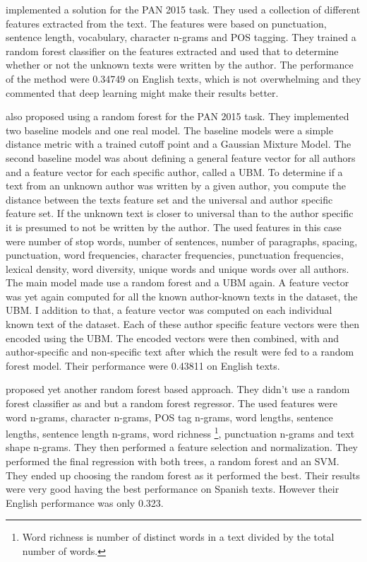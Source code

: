 \cite{maitra2015} implemented a solution for the PAN 2015 task. They used a
collection of different features extracted from the text. The features were
based on punctuation, sentence length, vocabulary, character n-grams and
\gls{POS} tagging. They trained a random forest classifier on the features
extracted and used that to determine whether or not the unknown texts were
written by the author. The performance of the method were 0.34749 on English
texts, which is not overwhelming and they commented that deep learning might
make their results better.

\cite{pacheco2015} also proposed using a random forest for the PAN 2015 task.
They implemented two baseline models and one real model. The baseline models
were a simple distance metric with a trained cutoff point and a Gaussian Mixture
Model. The second baseline model was about defining a general feature vector for
all authors and a feature vector for each specific author, called a \gls{UBM}.
To determine if a text from an unknown author was written by a given author,
you compute the distance between the texts feature set and the universal and
author specific feature set. If the unknown text is closer to universal than to
the author specific it is presumed to not be written by the author. The used
features in this case were number of stop words, number of sentences, number
of paragraphs, spacing, punctuation, word frequencies, character frequencies,
punctuation frequencies, lexical density, word diversity, unique words and
unique words over all authors. The main model made use a random forest and a
\gls{UBM} again. A feature vector was yet again computed for all the known
author-known texts in the dataset, the \gls{UBM}. I addition to that, a feature
vector was computed on each individual known text of the dataset. Each of these
author specific feature vectors were then encoded using the \gls{UBM}. The
encoded vectors were then combined, with and author-specific and non-specific
text after which the result were fed to a random forest model. Their performance
were 0.43811 on English texts.

\cite{bartoli2015b} proposed yet another random forest based approach.
They didn't use a random forest classifier as \cite{maitra2015} and
\cite{pacheco2015} but a random forest regressor. The used features were word
n-grams, character n-grams, \gls{POS} tag n-grams, word lengths, sentence
lengths, sentence length n-grams, word richness \footnote{Word richness is
number of distinct words in a text divided by the total number of words.},
punctuation n-grams and text shape n-grams. They then performed a feature
selection and normalization. They performed the final regression with both
trees, a random forest and an SVM. They ended up choosing the random forest as
it performed the best. Their results were very good having the best performance
on Spanish texts. However their English performance was only 0.323.

